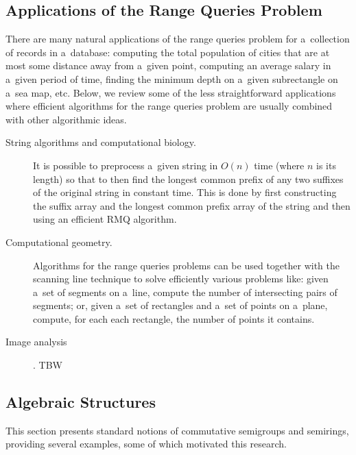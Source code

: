 \documentclass[11pt,letterpaper]{article}
\begin{document}
\subsection{Applications of the Range Queries Problem}\label{subseq:rmqapp}
There are many natural applications of the range queries problem for a~collection of records in a~database: computing the total population of cities that are at most some distance away from a~given point, computing an average salary in a~given period of time, finding the minimum depth on a~given subrectangle on a~sea map, etc. Below, we review some of the less straightforward applications where efficient algorithms for the range queries problem are usually combined with other algorithmic ideas.
\begin{description}
\item[String algorithms and computational biology.]
It is possible to preprocess a~given string in $O(n)$ time (where $n$ is its length) so that to then find the longest common prefix of any two suffixes of the original string in constant time. This is done by first constructing the suffix array and the longest common prefix array of the string and then using an efficient RMQ algorithm.

\item[Computational geometry.] Algorithms for the range queries problems can be used together with the scanning line technique{} to solve efficiently various problems like: given a~set of segments on a~line, compute the number of intersecting pairs of segments; or, given a~set of rectangles and a~set of points on a~plane, compute, for each each rectangle, the number of points it contains. 

\item[Image analysis]. TBW

\end{description}


\subsection{Algebraic Structures}\label{subsec:algstr}

This section presents standard notions of commutative semigroups and semirings,
providing several examples, some of which motivated this research.
\end{document}
